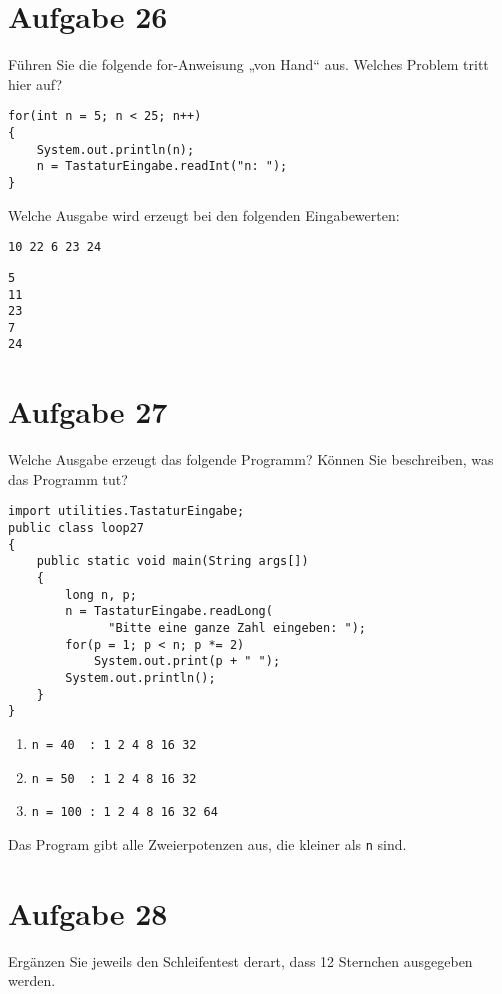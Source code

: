 \documentclass[10pt, oneside]{article}
\begin{document}
\section{Aufgabe 26}

Führen Sie die folgende for-Anweisung „von Hand“ aus. Welches Problem tritt hier
auf?

\begin{verbatim}
for(int n = 5; n < 25; n++)
{
    System.out.println(n);
    n = TastaturEingabe.readInt("n: ");
}
\end{verbatim}

Welche Ausgabe wird erzeugt bei den folgenden Eingabewerten:

\verb|10 22 6 23 24|

\begin{verbatim}
5
11
23
7
24
\end{verbatim}

\section{Aufgabe 27}

Welche Ausgabe erzeugt das folgende Programm? Können Sie beschreiben, was das
Programm tut?

\begin{verbatim}
import utilities.TastaturEingabe;
public class loop27
{
    public static void main(String args[])
    {
        long n, p;
        n = TastaturEingabe.readLong(
              "Bitte eine ganze Zahl eingeben: ");
        for(p = 1; p < n; p *= 2)
            System.out.print(p + " ");
        System.out.println();
    }
}
\end{verbatim}

\pagebreak

\begin{enumerate}
    \item \verb|n = 40  : 1 2 4 8 16 32|
    \item \verb|n = 50  : 1 2 4 8 16 32|
    \item \verb|n = 100 : 1 2 4 8 16 32 64|
\end{enumerate}

Das Program gibt alle Zweierpotenzen aus, die kleiner als \verb|n| sind.

\section{Aufgabe 28}

Ergänzen Sie jeweils den Schleifentest derart, dass 12 Sternchen ausgegeben werden.
\end{document}
